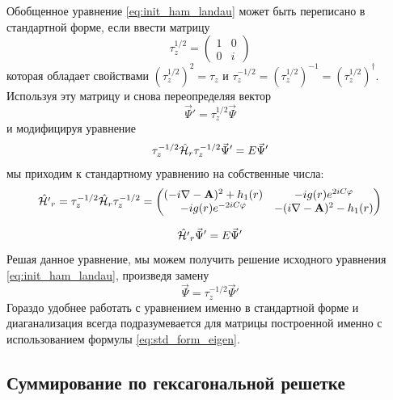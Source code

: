 \documentclass[a4paper,article,14pt]{extarticle}
\begin{document}
Обобщенное уравнение \eqref{eq:init_ham_landau} может быть переписано в стандартной форме, если ввести матрицу
$$
\tau_z^{1/2} = 
	\begin{pmatrix} 	
		1 &  0 \\
		0 &  i 
	\end{pmatrix}
$$
которая обладает свойствами $(\tau_z^{1/2})^2 = \tau_z$ и $\tau_z^{-1/2}=(\tau_z^{1/2})^{-1}=(\tau_z^{1/2})^\dagger$.
Используя эту матрицу и снова переопределяя вектор 
$$
\vec{\Psi}'=\tau_z^{1/2} \vec{\Psi}
$$
и модифицируя уравнение
$$
\tau_z^{-1/2} \hat {\cal H}_{r} \tau_z^{-1/2} \vec{\Psi}' = E \vec{\Psi}'
$$
мы приходим к стандартному уравнению на собственные числа:
\begin{equation}
\label{eq:std_form_eigen}
\hat {\cal H'}_{r} = \tau_z^{-1/2} \hat {\cal H}_{r} \tau_z^{-1/2} = \begin{pmatrix} 
(- i \nabla - \mathbf{A} ) ^ 2 + h_1 (r) &  -i g (r) e^{2 i C \varphi} \\  
-i g (r) e^{-2 i C \varphi}   & - ( i \nabla - \mathbf{A} ) ^ 2 - h_1 (r) 
\end{pmatrix}
\end{equation}

$$
\hat {\cal H'}_{r} \vec{\Psi}' = E \vec{\Psi}'
$$
Решая данное уравнение, мы можем получить решение исходного уравнения \eqref{eq:init_ham_landau}, произведя замену
$$
\vec{\Psi} = \tau_z^{-1/2} \vec{\Psi}'
$$
Гораздо удобнее работать с уравнением именно в стандартной форме и диаганализация всегда подразумевается для матрицы построенной именно с использованием формулы \eqref{eq:std_form_eigen}.


\subsection{ Суммирование по гексагональной решетке }
\end{document}
